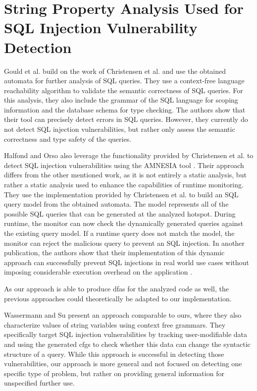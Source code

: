 \section{String Property Analysis Used for SQL Injection Vulnerability Detection}\label{sec:related:stringPropertySql}

Gould et al. \cite{gould2004static} build on the work of Christensen et al. and use the obtained automata for further analysis of SQL queries. They use a context-free language reachability algorithm to validate the semantic correctness of SQL queries. For this analysis, they also include the grammar of the SQL language for scoping information and the database schema for type checking.
The authors show that their tool can precisely detect errors in SQL queries. However, they currently do not detect SQL injection vulnerabilities, but rather only assess the semantic correctness and type safety of the queries.

Halfond and Orso also leverage the functionality provided by Christensen et al. to detect SQL injection vulnerabilities using the AMNESIA tool \cite{amnesia}. Their approach differs from the other mentioned work, as it is not entirely a static analysis, but rather a static analysis used to enhance the capabilities of runtime monitoring. They use the implementation provided by Christensen et al. to build an SQL query model from the obtained automata. The model represents all of the possible SQL queries that can be generated at the analyzed hotspot.
During runtime, the monitor can now check the dynamically generated queries against the existing query model. If a runtime query does not match the model, the monitor can reject the malicious query to prevent an SQL injection. In another publication, the authors show that their implementation of this dynamic approach can successfully prevent SQL injections in real world use cases without imposing considerable execution overhead on the application \cite{amnesia_evaluation}.

As our approach is able to produce \acp{dfa} for the analyzed code as well, the previous approaches could theoretically be adapted to our implementation.

Wassermann and Su \cite{sqli_wassermann_su} present an approach comparable to ours, where they also characterize values of string variables using context free grammars. They specifically target SQL injection vulnerabilities by tracking user-modifiable data and using the generated \acp{cfg} to check whether this data can change the syntactic structure of a query. While this approach is successful in detecting those vulnerabilities, our approach is more general and not focused on detecting one specific type of problem, but rather on providing general information for unspecified further use.


